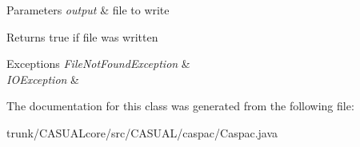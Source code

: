 \begin{DoxyParams}{Parameters}
{\em output} & file to write \\
\hline
\end{DoxyParams}
\begin{DoxyReturn}{Returns}
true if file was written 
\end{DoxyReturn}

\begin{DoxyExceptions}{Exceptions}
{\em File\-Not\-Found\-Exception} & \\
\hline
{\em I\-O\-Exception} & \\
\hline
\end{DoxyExceptions}


The documentation for this class was generated from the following file\-:\begin{DoxyCompactItemize}
\item 
trunk/\-C\-A\-S\-U\-A\-Lcore/src/\-C\-A\-S\-U\-A\-L/caspac/Caspac.\-java\end{DoxyCompactItemize}
